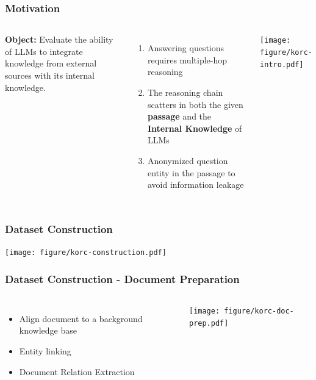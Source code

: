 \documentclass{beamer}
\begin{document}
\begin{frame}
\frametitle{Motivation}
\begin{columns}
    \textbf{Object:} Evaluate the ability of LLMs to integrate knowledge from external sources with its internal knowledge.
    \begin{enumerate}
        \item Answering questions requires multiple-hop reasoning
        \item The reasoning chain scatters in both the given \textbf{passage} and the \textbf{Internal Knowledge} of LLMs
        \item Anonymized question entity in the passage to avoid information leakage
    \end{enumerate}
    \vspace*{-0.2cm}
    \begin{center}
        \texttt{[image: figure/korc-intro.pdf]}
    \end{center}
\end{columns}
\end{frame}


\begin{frame}
\frametitle{Dataset Construction}
\begin{center}
    \texttt{[image: figure/korc-construction.pdf]}
\end{center}
\end{frame}

\begin{frame}
\frametitle{Dataset Construction - Document Preparation}
\begin{columns}
    \begin{itemize}
        \item Align document to a background knowledge base
        \item Entity linking
        \item Document Relation Extraction
    \end{itemize}
    \begin{center}
        \texttt{[image: figure/korc-doc-prep.pdf]}
    \end{center}
\end{columns}    
\end{frame}
\end{document}
